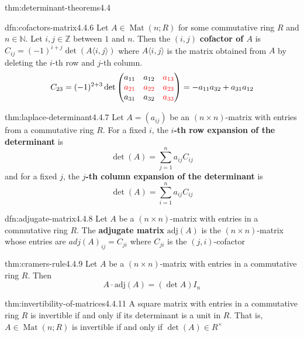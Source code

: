 \documentclass[landscape, 8pt]{extarticle}
\DeclareMathOperator{\Mat}{Mat}
\begin{document}
\begin{multicols}{3}
\begin{thm}{thm:determinant-theorems}{4.4}
\begin{itemize}
    \end{itemize}
\end{thm}

\begin{dfn}{dfn:cofactors-matrix}{4.4.6}
    Let $A \in \Mat(n;R)$ for some commutative ring $R$ and $n\in \mathbb{N}$. Let $i,j\in\mathbb{Z}$ between $1$ and $n$. Then the $(i, j)$ \textbf{cofactor of $A$} is $C_{ij} = (-1)^{i + j} \det(A\langle i,j \rangle)$ where $A\langle i, j \rangle$ is the matrix obtained from $A$ by deleting the $i$-th row and $j$-th column.
    \[C_{23} = (-1)^{2 + 3} \det \begin{pmatrix}
        a_{11} & a_{12}& \textcolor{red}{a_{13}}\\
        \textcolor{red}{a_{21}}& \textcolor{red}{a_{22}}& \textcolor{red}{a_{23}}\\
        a_{31}& a_{32}& \textcolor{red}{a_{33}}
    \end{pmatrix} = -a_{11}a_{32} + a_{31}a_{12}\]
\end{dfn}

\begin{thm}{thm:laplace-determinant}{4.4.7}
    Let $A = (a_{ij})$ be an $(n \times n)$-matrix with entries from a commutative ring $R$. For a fixed $i$, the \textbf{$i$-th row expansion of the determinant} is
    \[\det(A) = \sum_{j = 1}^{n}a_{ij}C_{ij}\]
    and for a fixed $j$, the \textbf{$j$-th column expansion of the determinant} is
    \[\det(A) = \sum_{i = 1}^{n} a_{ij} C_{ij}\]
\end{thm}

\begin{dfn}{dfn:adjugate-matrix}{4.4.8}
    Let $A$ be a $(n \times n)$-matrix with entries in a commutative ring $R$. The \textbf{adjugate matrix} $\text{adj}(A)$ is the $(n \times n)$-matrix whose entries are $adj(A)_{ij} = C_{ji}$ where $C_{ji}$ is the $(j, i)$-cofactor
\end{dfn}

\begin{thm}{thm:cramers-rule}{4.4.9}
    Let $A$ be a $(n \times n)$-matrix with entries in a commutative ring $R$. Then
    \[A \cdot \text{adj}(A) = (\det A)I_{n}\]
\end{thm}

\begin{thm}{thm:invertibility-of-matrices}{4.4.11}
    A square matrix with entries in a commutative ring $R$ is invertible if and only if its determinant is a unit in $R$. That is, $A\in \Mat(n;R)$ is invertible if and only if $\det(A)\in R^{\times}$
\end{thm}


\end{multicols}
\end{document}
